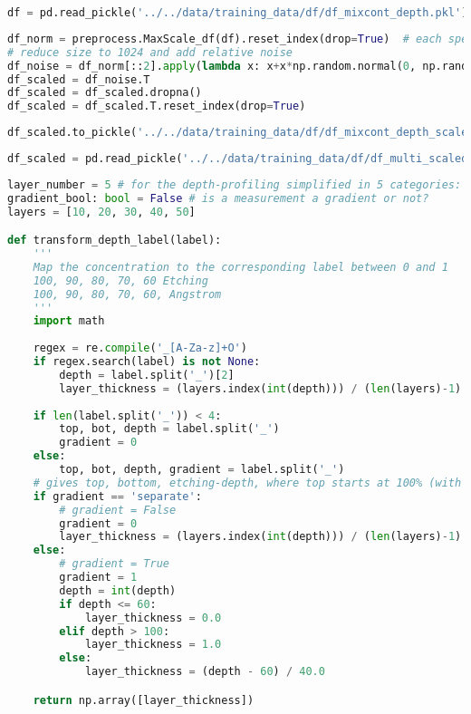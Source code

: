 \begin{lstlisting}[language=Python]
df = pd.read_pickle('../../data/training_data/df/df_mixcont_depth.pkl') 
\end{lstlisting}

\begin{lstlisting}[language=Python]
df_norm = preprocess.MaxScale_df(df).reset_index(drop=True)  # each spectrum is scaled to 1
# reduce size to 1024 and add relative noise
df_noise = df_norm[::2].apply(lambda x: x+x*np.random.normal(0, np.random.randint(1,3)*0.01 , len(x)))
df_scaled = df_noise.T
df_scaled = df_scaled.dropna()
df_scaled = df_scaled.T.reset_index(drop=True)
\end{lstlisting}

\begin{lstlisting}[language=Python]
df_scaled.to_pickle('../../data/training_data/df/df_mixcont_depth_scaled.pkl')  # save the normalized, scaled df
\end{lstlisting}

\begin{lstlisting}[language=Python]
df_scaled = pd.read_pickle('../../data/training_data/df/df_multi_scaled.pkl')
\end{lstlisting}

\begin{lstlisting}[language=Python]
layer_number = 5 # for the depth-profiling simplified in 5 categories: 0-10, 10-20, 20-30, 30-40, 40-50 Angstrom
gradient_bool: bool = False # is a measurement a gradient or not?
layers = [10, 20, 30, 40, 50]

def transform_depth_label(label):
    '''
    Map the concentration to the corresponding label between 0 and 1
    100, 90, 80, 70, 60 Etching
    100, 90, 80, 70, 60, Angstrom
    '''
    import math
    
    regex = re.compile('_[A-Za-z]+O')
    if regex.search(label) is not None:
        depth = label.split('_')[2]
        layer_thickness = (layers.index(int(depth))) / (len(layers)-1)
            
    if len(label.split('_')) < 4:
        top, bot, depth = label.split('_')
        gradient = 0
    else:
        top, bot, depth, gradient = label.split('_')
    # gives top, bottom, etching-depth, where top starts at 100% (with 0 etching) on the top
    if gradient == 'separate':
        # gradient = False
        gradient = 0
        layer_thickness = (layers.index(int(depth))) / (len(layers)-1)
    else:
        # gradient = True
        gradient = 1
        depth = int(depth)
        if depth <= 60:
            layer_thickness = 0.0
        elif depth > 100:
            layer_thickness = 1.0
        else:
            layer_thickness = (depth - 60) / 40.0

    return np.array([layer_thickness])
\end{lstlisting}


